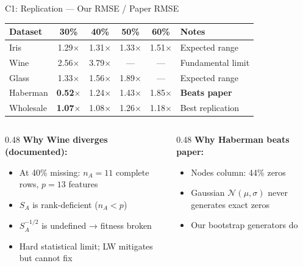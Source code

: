 \documentclass[aspectratio=169,12pt]{beamer}
\begin{document}
\begin{frame}{C1: Replication — Our RMSE / Paper RMSE}

\renewcommand{\arraystretch}{1.2}
\begin{tabular}{lccccl}
\toprule
\textbf{Dataset} & \textbf{30\%} & \textbf{40\%} & \textbf{50\%} & \textbf{60\%} & \textbf{Notes} \\
\midrule
Iris      & 1.29$\times$ & 1.31$\times$ & 1.33$\times$ & 1.51$\times$ & Expected range \\
Wine      & 2.56$\times$ & 3.79$\times$ & --- & --- & \alert{Fundamental limit} \\
Glass     & 1.33$\times$ & 1.56$\times$ & 1.89$\times$ & --- & Expected range \\
Haberman  & \textbf{0.52}$\times$ & 1.24$\times$ & 1.43$\times$ & 1.85$\times$ & \textbf{Beats paper} \\
Wholesale & \textbf{1.07}$\times$ & 1.08$\times$ & 1.26$\times$ & 1.18$\times$ & Best replication \\
\bottomrule
\end{tabular}

\bigskip
\begin{columns}
\begin{column}{0.48\textwidth}
\textbf{Why Wine diverges (documented):}
\begin{itemize}
  \item At 40\% missing: $n_A = 11$ complete rows, $p = 13$ features
  \item $S_A$ is rank-deficient ($n_A < p$)
  \item $S_A^{-1/2}$ is undefined → fitness broken
  \item Hard statistical limit; LW mitigates but cannot fix
\end{itemize}
\end{column}
\begin{column}{0.48\textwidth}
\textbf{Why Haberman beats paper:}
\begin{itemize}
  \item Nodes column: 44\% zeros
  \item Gaussian $\mathcal{N}(\mu,\sigma)$ never generates exact zeros
  \item Our bootstrap generators do
\end{itemize}
\end{column}
\end{columns}

\end{frame}
\end{document}
